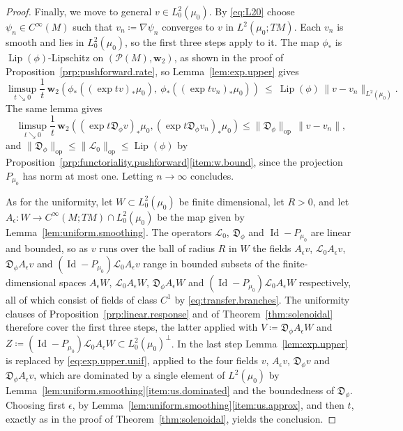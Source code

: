 \documentclass[11pt,reqno]{amsart}
\theoremstyle{plain}
\theoremstyle{definition}
\newcommand{\dw}{\mathbf{w}_2}
\newcommand{\D}{\mathfrak{D}}
\newcommand{\Prob}{\mathcal{P}}
\newcommand{\Transf}{\mathcal{L}}
\DeclareMathOperator{\Id}{Id}
\DeclareMathOperator{\Lip}{Lip}
\begin{document}
\begin{proof}
    Finally, we move to general \( v\in L^2_0(\mu_0) \).
    By \eqref{eq:L20} choose \( \psi_n\in C^\infty(M) \) such that \( v_n\coloneqq\nabla\psi_n \) converges to \( v \) in \( L^2(\mu_0;TM) \). 
    Each \( v_n \) is smooth and lies in \( L^2_0(\mu_0) \), so the first three steps apply to it.
    The map \( \phi_\ast \) is \( \Lip(\phi) \)-Lipschitz on \( (\Prob(M),\dw) \), as shown in the proof of Proposition~\ref{prp:pushforward.rate}, so Lemma~\ref{lem:exp.upper} gives
    \[
        \limsup_{t\searrow0}\frac1t\,\dw\left(\phi_\ast\left((\exp tv)_\ast\mu_0\right),\ \phi_\ast\left((\exp tv_n)_\ast\mu_0\right)\right)\ \le\ \Lip(\phi)\,\lVert v-v_n\rVert_{L^2(\mu_0)} .
    \]
    The same lemma gives 
    \[ 
        \limsup_{t\searrow0}\frac1t\,\dw\left((\exp t\D_\phi v)_\ast\mu_0,(\exp t\D_\phi v_n)_\ast\mu_0\right)\le\lVert\D_\phi\rVert_{\mathrm{op}}\,\lVert v-v_n\rVert,
    \] 
    and \( \lVert\D_\phi\rVert_{\mathrm{op}}\le\lVert\Transf_0\rVert_{\mathrm{op}}\le\Lip(\phi) \) by Proposition~\ref{prp:functoriality.pushforward}\ref{item:w.bound}, since the projection \( P_{\mu_0} \) has norm at most one.
    Letting \( n\to\infty \) concludes.

    As for the uniformity, let \( W\subset L^2_0(\mu_0) \) be finite dimensional, let \( R>0 \), and let \( A_\epsilon:W\to C^\infty(M;TM)\cap L^2_0(\mu_0) \) be the map given by Lemma~\ref{lem:uniform.smoothing}.
    The operators \( \Transf_0 \), \( \D_\phi \) and \( \Id-P_{\mu_0} \) are linear and bounded, so as \( v \) runs over the ball of radius \( R \) in \( W \) the fields \( A_\epsilon v \), \( \Transf_0A_\epsilon v \), \( \D_\phi A_\epsilon v \) and \( (\Id-P_{\mu_0})\Transf_0A_\epsilon v \) range in bounded subsets of the finite-dimensional spaces \( A_\epsilon W \), \( \Transf_0A_\epsilon W \), \( \D_\phi A_\epsilon W \) and \( (\Id-P_{\mu_0})\Transf_0A_\epsilon W \) respectively, all of which consist of fields of class \( C^1 \) by \eqref{eq:transfer.branches}.
    The uniformity clauses of Proposition~\ref{prp:linear.response} and of Theorem~\ref{thm:solenoidal} therefore cover the first three steps, the latter applied with \( V\coloneqq\D_\phi A_\epsilon W \) and \( Z\coloneqq(\Id-P_{\mu_0})\Transf_0A_\epsilon W\subset L^2_0(\mu_0)^\perp \).
    In the last step Lemma~\ref{lem:exp.upper} is replaced by \eqref{eq:exp.upper.unif}, applied to the four fields \( v \), \( A_\epsilon v \), \( \D_\phi v \) and \( \D_\phi A_\epsilon v \), which are dominated by a single element of \( L^2(\mu_0) \) by Lemma~\ref{lem:uniform.smoothing}\ref{item:us.dominated} and the boundedness of \( \D_\phi \).
    Choosing first \( \epsilon \), by Lemma~\ref{lem:uniform.smoothing}\ref{item:us.approx}, and then \( t \), exactly as in the proof of Theorem~\ref{thm:solenoidal}, yields the conclusion.
\end{proof}
\end{document}
